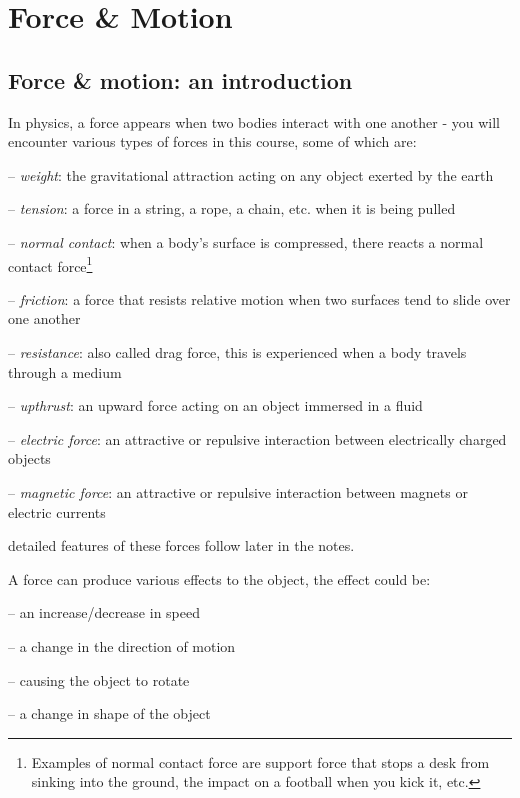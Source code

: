 \chapter{Force \& Motion}

\section{Force \& motion: an introduction}

In physics, a force appears when two bodies interact with one another - you will encounter various types of forces in this course, some of which are:
\begin{compactitem}
	\item[--] \emph{weight}: the gravitational attraction acting on any object exerted by the earth
	
	\item[--] \emph{tension}: a force in a string, a rope, a chain, etc. when it is being pulled
	
	\item[--] \emph{normal contact}: when a body's surface is compressed, there reacts a normal contact force\footnote{Examples of normal contact force are support force that stops a desk from sinking into the ground, the impact on a football when you kick it, etc.}
	
	\item[--] \emph{friction}: a force that resists relative motion when two surfaces tend to slide over one another
	
	\item[--] \emph{resistance}: also called drag force, this is experienced when a body travels through a medium

	
	\item[--] \emph{upthrust}: an upward force acting on an object immersed in a fluid
	
	\item[--] \emph{electric force}: an attractive or repulsive interaction between electrically charged objects
	\item[--] \emph{magnetic force}: an attractive or repulsive interaction between magnets or electric currents
\end{compactitem}

detailed features of these forces follow later in the notes.

A force can produce various effects to the object, the effect could be:

\begin{compactitem}
	\item[--] an increase/decrease in speed
	
	\item[--] a change in the direction of motion
	
	\item[--] causing the object to rotate
	
	\item[--] a change in shape of the object
\end{compactitem}

